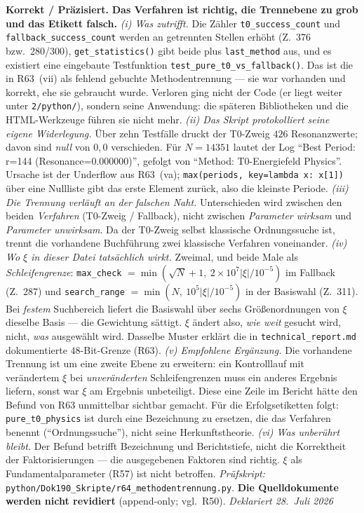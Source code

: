 \smallskip\noindent\textbf{Korrekt / Präzisiert.}\quad
\textbf{Das Verfahren ist richtig, die Trennebene zu grob und das Etikett
falsch.}
\emph{(i) Was zutrifft.} Die Zähler \texttt{t0\_success\_count} und
\texttt{fallback\_success\_count} werden an getrennten Stellen erhöht
(Z.~376 bzw.\ 280/300), \texttt{get\_statistics()} gibt beide plus
\texttt{last\_method} aus, und es existiert eine eingebaute Testfunktion
\texttt{test\_pure\_t0\_vs\_fallback()}. Das ist die in R63~(vii) als
fehlend gebuchte Methodentrennung --- sie war vorhanden und korrekt, ehe
sie gebraucht wurde. Verloren ging nicht der Code (er liegt weiter unter
\texttt{2/python/}), sondern seine Anwendung: die späteren Bibliotheken
und die HTML-Werkzeuge führen sie nicht mehr.
\emph{(ii) Das Skript protokolliert seine eigene Widerlegung.} Über zehn
Testfälle druckt der T0-Zweig $426$ Resonanzwerte; davon sind
\emph{null} von $0{,}0$ verschieden. Für $N = 14351$ lautet der Log
\enquote{Best Period: r=144 (Resonance=0.000000)}, gefolgt von
\enquote{Method: T0-Energiefeld Physics}. Ursache ist der Underflow aus
R63~(va); \texttt{max(periods, key=lambda x: x[1])} über eine Nullliste
gibt das erste Element zurück, also die kleinste Periode.
\emph{(iii) Die Trennung verläuft an der falschen Naht.} Unterschieden
wird zwischen den beiden \emph{Verfahren} (T0-Zweig / Fallback), nicht
zwischen \emph{Parameter wirksam} und \emph{Parameter unwirksam}. Da der
T0-Zweig selbst klassische Ordnungssuche ist, trennt die vorhandene
Buchführung zwei klassische Verfahren voneinander.
\emph{(iv) Wo $\xi$ in dieser Datei tatsächlich wirkt.} Zweimal, und
beide Male als \emph{Schleifengrenze}:
\texttt{max\_check} $=\min(\sqrt{N}+1,\ 2\times10^{7}|\xi|/10^{-5})$ im
Fallback (Z.~287) und
\texttt{search\_range} $=\min(N,\ 10^{5}|\xi|/10^{-5})$ in der Basiswahl
(Z.~311). Bei \emph{festem} Suchbereich liefert die Basiswahl über sechs
Größenordnungen von $\xi$ dieselbe Basis --- die Gewichtung sättigt.
$\xi$ ändert also, \emph{wie weit} gesucht wird, nicht, \emph{was}
ausgewählt wird. Dasselbe Muster erklärt die in
\texttt{technical\_report.md} dokumentierte $48$-Bit-Grenze (R63).
\emph{(v) Empfohlene Ergänzung.} Die vorhandene Trennung ist um eine
zweite Ebene zu erweitern: ein Kontrolllauf mit verändertem $\xi$ bei
\emph{unveränderten} Schleifengrenzen muss ein anderes Ergebnis liefern,
sonst war $\xi$ am Ergebnis unbeteiligt. Diese eine Zeile im Bericht
hätte den Befund von R63 unmittelbar sichtbar gemacht. Für die
Erfolgsetiketten folgt: \texttt{pure\_t0\_physics} ist durch eine
Bezeichnung zu ersetzen, die das Verfahren benennt
(\enquote{Ordnungssuche}), nicht seine Herkunftstheorie.
\emph{(vi) Was unberührt bleibt.} Der Befund betrifft Bezeichnung und
Berichtstiefe, nicht die Korrektheit der Faktorisierungen --- die
ausgegebenen Faktoren sind richtig. $\xi$ als Fundamentalparameter
(R57) ist nicht betroffen.
\emph{Prüfskript:}
\texttt{python/\allowbreak Dok190\_\allowbreak Skripte/\allowbreak r64\_\allowbreak methodentrennung.py}.
\textbf{Die Quelldokumente werden nicht revidiert}
(append-only; vgl.\ R50). \emph{Deklariert 28.~Juli 2026}

